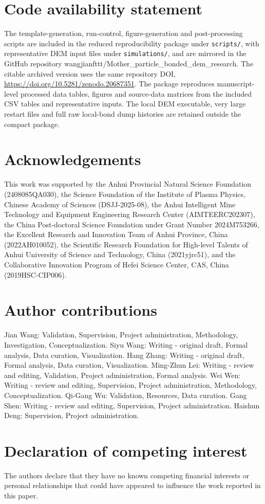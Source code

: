 \documentclass[preprint,12pt]{elsarticle}
\begin{document}
\section{Code availability statement}

The template-generation, run-control, figure-generation and post-processing scripts are included in the reduced reproducibility package under \texttt{scripts/}, with representative DEM input files under \texttt{simulations/}, and are mirrored in the GitHub repository wangjianfttt/Mother\_particle\_bonded\_dem\_research. The citable archived version uses the same repository DOI, \url{https://doi.org/10.5281/zenodo.20687351}. The package reproduces manuscript-level processed data tables, figures and source-data matrices from the included CSV tables and representative inputs. The local DEM executable, very large restart files and full raw local-bond dump histories are retained outside the compact package.


\section{Acknowledgements}

This work was supported by the Anhui Provincial Natural Science Foundation (2408085QA030), the Science Foundation of the Institute of Plasma Physics, Chinese Academy of Sciences (DSJJ-2025-08), the Anhui Intelligent Mine Technology and Equipment Engineering Research Center (AIMTEERC202307), the China Post-doctoral Science Foundation under Grant Number 2024M753266, the Excellent Research and Innovation Team of Anhui Province, China (2022AH010052), the Scientific Research Foundation for High-level Talents of Anhui University of Science and Technology, China (2021yjrc51), and the Collaborative Innovation Program of Hefei Science Center, CAS, China (2019HSC-CIP006).


\section{Author contributions}

Jian Wang: Validation, Supervision, Project administration, Methodology, Investigation, Conceptualization. Siyu Wang: Writing - original draft, Formal analysis, Data curation, Visualization. Hang Zhang: Writing - original draft, Formal analysis, Data curation, Visualization. Ming-Zhun Lei: Writing - review and editing, Validation, Project administration, Formal analysis. Wei Wen: Writing - review and editing, Supervision, Project administration, Methodology, Conceptualization. Qi-Gang Wu: Validation, Resources, Data curation. Gang Shen: Writing - review and editing, Supervision, Project administration. Haishun Deng: Supervision, Project administration.


\section{Declaration of competing interest}

The authors declare that they have no known competing financial interests or personal relationships that could have appeared to influence the work reported in this paper.





\end{document}
